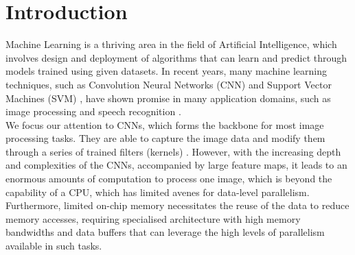 \documentclass[a4paper,12pt, final]{report}
\begin{document}
\clearpage 
\renewcommand{\abstractname}{Abstract} 

\tableofcontents
  \listoffigures
  \listoftables



\chapter{Introduction}

Machine Learning is a thriving area in the field of Artificial Intelligence, which involves design and deployment of algorithms that can learn and predict through models trained using given datasets. In recent years, many machine learning techniques, such as Convolution Neural Networks (CNN) \cite{CNNs} and Support Vector Machines (SVM) \cite{SVMs}, have shown promise in many application domains, such as image processing and speech recognition \cite{LeNet,CNN1,CNN2,GoogleNet,ALexNet,ResNet,YOLO,CNN7,CNN5}.  
\\

We focus our attention to CNNs, which forms the backbone for most image processing tasks. They are able to capture the image data and modify them through a series of trained filters (kernels) \cite{CNNs}. However, with the increasing depth and complexities of the CNNs, accompanied by large feature maps, it leads to an enormous amounts of computation to process one image, which is beyond the capability of a CPU, which has limited avenes for data-level parallelism. Furthermore, limited on-chip memory necessitates the reuse of the data to reduce memory accesses, requiring specialised architecture with high memory bandwidths and data buffers that can leverage the high levels of parallelism available in such tasks.
\\
\end{document}
